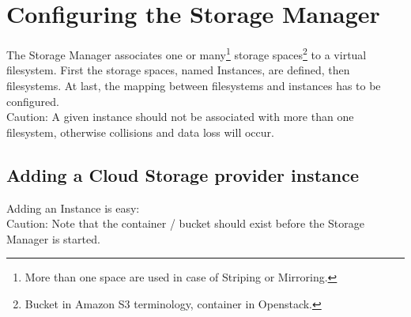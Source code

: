 \documentclass[11pt,fleqn,openany]{book} %
\begin{document}
\section{Configuring the Storage Manager}
\label{sec:configuring-the-storage-manager}

The Storage Manager associates one or many\footnote{More than one space are used in case of Striping or Mirroring.} storage spaces\footnote{Bucket in Amazon S3 terminology, container in Openstack.} to
a virtual filesystem. First the storage spaces, named {\color{red}Instances}, are defined, then {\color{red}filesystems}. At last, the mapping between filesystems and instances has to be configured.\\

{\color{red}Caution: A given instance should not be associated with more than one filesystem, otherwise collisions and data loss will occur.}

\subsection*{Adding a Cloud Storage provider instance}

Adding an {\color{red}Instance} is easy:\\

{\color{red}Caution: Note that the container / bucket should exist before the Storage Manager is started.}
\end{document}
